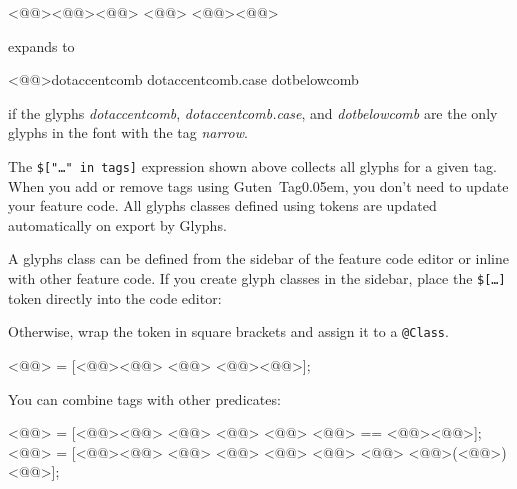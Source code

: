 \begin{RichListing}
<@\hspace{\parindent}@><@\Token{\$[}@><@@> <@@> <@@><@\Token{]}@>
\end{RichListing}

\noindent expands to

\begin{RichListing}
<@\hspace{\parindent}@>dotaccentcomb dotaccentcomb.case dotbelowcomb
\end{RichListing}

\noindent if the glyphs \emph{dotaccentcomb}, \emph{dotaccentcomb.case}, and \emph{dotbelowcomb} are the only glyphs in the font with the tag \emph{narrow}.

The \texttt{\$["…" in tags]} expression shown above collects all glyphs for a given tag.
When you add or remove tags using Guten~Tag\kern0.05em, you don’t need to update your feature code.
All glyphs classes defined using tokens are updated automatically on export by Glyphs.

A glyphs class can be defined from the sidebar of the feature code editor or inline with other feature code.
If you create glyph classes in the sidebar, place the \texttt{\$[…]} token directly into the code editor:

\bigbreak\noindent{}

\noindent Otherwise, wrap the token in square brackets and assign it to a \texttt{@Class}.

\begin{RichListing}
<@@> = [<@\Token{\$[}@><@@> <@@> <@@><@\Token{]}@>];
\end{RichListing}

\noindent You can combine tags with other predicates:

\begin{RichListing}
<@@> = [<@\Token{\$[}@><@@> <@@> <@@> <@@> <@@> == <@@><@\Token{]}@>];
<@@>   = [<@\Token{\$[}@><@@> <@@> <@@> <@@>
                  <@@> <@@> <@@>(<@@>)<@\Token{]}@>];
\end{RichListing}

